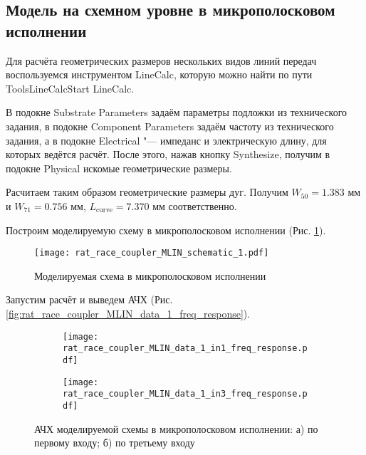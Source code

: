 \subsection{Модель на схемном уровне в микрополосковом исполнении}

Для расчёта геометрических размеров нескольких видов линий передач воспользуемся инструментом LineCalc, которую можно найти по пути Tools\textrightarrow LineCalc\textrightarrow Start LineCalc.

В подокне Substrate Parameters задаём параметры подложки из технического задания, в подокне Component Parameters задаём частоту из технического задания, а в подокне Electrical "--- импеданс и электрическую длину, для которых ведётся расчёт.
После этого, нажав кнопку Synthesize, получим в подокне Physical искомые геометрические размеры.

Расчитаем таким образом геометрические размеры дуг.
Получим $W_{50} = 1.383 \text{~мм}$ и $W_{71} = 0.756 \text{~мм}$, $L_\text{curve} = 7.370 \text{~мм}$ соответственно.

Построим моделируемую схему в микрополосковом исполнении (Рис. \ref{fig:rat_race_coupler_MLIN_schematic_1}).

\begin{figure}[!ht]
    \centering
    \texttt{[image: rat\_race\_coupler\_MLIN\_schematic\_1.pdf]}
    \caption{Моделируемая схема в микрополосковом исполнении}
    \label{fig:rat_race_coupler_MLIN_schematic_1}
\end{figure}

Запустим расчёт и выведем АЧХ (Рис. \ref{fig:rat_race_coupler_MLIN_data_1_freq_response}).

\begin{figure}[!ht]
    \begin{subfigure}[b]{0.45\textwidth}
        \centering
        \texttt{[image: rat\_race\_coupler\_MLIN\_data\_1\_in1\_freq\_response.pdf]}
        \caption{}
        \label{fig:rat_race_coupler_MLIN_data_1_in1_freq_response}
    \end{subfigure}
    \hfill
    \begin{subfigure}[b]{0.45\textwidth}
        \centering
        \texttt{[image: rat\_race\_coupler\_MLIN\_data\_1\_in3\_freq\_response.pdf]}
        \caption{}
        \label{fig:rat_race_coupler_MLIN_data_1_in3_freq_response}
    \end{subfigure}
    \caption{АЧХ моделируемой схемы в микрополосковом исполнении:
        а) по первому входу;
        б) по третьему входу
    }
    \label{fig:rat_race_coupler_data_1_freq_response}
\end{figure}


